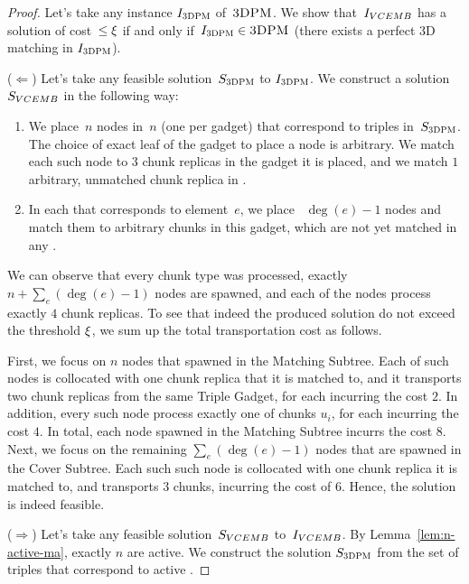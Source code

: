 \begin{proof}
  
  Let's take any instance $I_{\textsc{3DPM}}$ of~$\textsc{3DPM}$.
  We show that~$I_{VCEMB}$ has a solution of cost~$\leq \xi$ if and only if~$I_{\textsc{3DPM}} \in \textsc{3DPM}$ (there exists a perfect 3D matching in $I_{\textsc{3DPM}}$).

  ($\Leftarrow$) Let's take any feasible solution~$S_{\textsc{3DPM}}$ to $I_{\textsc{3DPM}}$.
  We construct a solution~$S_{VCEMB}$ in the following way:
  \begin{enumerate}
    \item We place~$n$ nodes in~$n$ {\TripleGadgets} (one per gadget) that correspond to triples in~$S_{\textsc{3DPM}}$.
    The choice of exact leaf of the gadget to place a node is arbitrary.
    We match each such node to $3$ chunk replicas in the gadget it is placed, and we match $1$ arbitrary, unmatched chunk replica in {\UnqSubtree}.
    \item In each {\ElGadget} that corresponds to element~$e$, we place
   ~$\deg(e) - 1$ nodes and match them to arbitrary chunks in this
    gadget, which are not yet matched in any {\TripleGadget}.
  \end{enumerate}

  We can observe that every chunk type was processed, exactly $n + \sum_e(\deg(e) - 1)$ nodes are spawned, and each of the nodes process exactly $4$ chunk replicas.
  To see that indeed the produced solution do not exceed the threshold $\xi$,
  we sum up the total transportation cost as follows.

  First, we focus on $n$ nodes that spawned in the Matching Subtree.
  Each of such nodes is collocated with one chunk replica that it is matched to,
  and it transports two chunk replicas from the same Triple Gadget, for each incurring the cost $2$.
  In addition, every such node process exactly one of chunks $u_i$, for each incurring the cost $4$.
  In total, each node spawned in the Matching Subtree incurrs the cost $8$.
  Next, we focus on the remaining $\sum_e(\deg(e)-1)$ nodes that are spawned in the Cover Subtree.
  Each such such node is collocated with one chunk replica it is matched to, and transports $3$ chunks, incurring the cost of $6$.
  Hence, the solution is indeed feasible.

  ($\Rightarrow$) Let's take any feasible solution~$S_{VCEMB}$ to~$I_{VCEMB}$.
  By Lemma~\ref{lem:n-active-ma}, exactly $n$ \TripleGadgets{} are active.
  We construct the solution $S_{\textsc{3DPM}}$ from the set of triples that correspond to active \TripleGadgets{}.


\end{proof}
